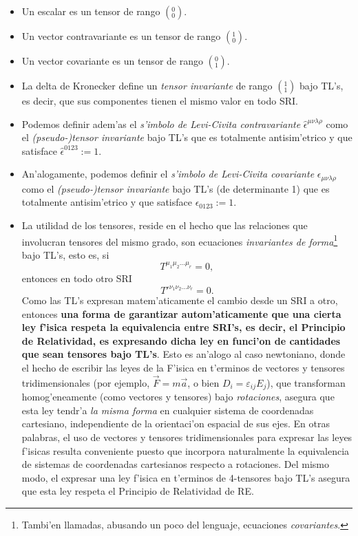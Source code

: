 \begin{itemize}
\item Un escalar es un tensor de rango $(^0_0)$.
\item Un vector contravariante es un tensor de rango $(^1_0)$.
\item Un vector covariante es un tensor de rango $(^0_1)$.
\item La delta de Kronecker define un \textit{tensor invariante} de rango $(^1_1)$ bajo TL's, es decir, que sus componentes tienen el mismo valor en todo SRI.
\item Podemos definir adem'as el \textit{s'imbolo de Levi-Civita contravariante} $\hat\epsilon^{\mu\nu\lambda\rho}$ como el \textit{(pseudo-)tensor invariante} bajo TL's que es totalmente antisim'etrico y que satisface $\hat\epsilon^{0123}:=1$.
\item An'alogamente, podemos definir el \textit{s'imbolo de Levi-Civita
covariante} $\epsilon_{\mu\nu\lambda\rho}$ como el \textit{(pseudo-)tensor invariante} bajo TL's (de determinante 1) que es totalmente antisim'etrico y
que satisface $\epsilon_{0123}:=1$.

\item La utilidad de los tensores, reside en el hecho que las relaciones que
involucran tensores del mismo grado, son ecuaciones 
\textit{invariantes de forma}\footnote{Tambi'en llamadas, abusando un poco del lenguaje, ecuaciones \textit{covariantes}.} bajo TL's, esto es, si
\begin{equation}
T^{\mu_1 \mu_2 ... \mu_r}=0,
\end{equation}
entonces en todo otro SRI 
\begin{equation}
T'^{\nu_1 \nu_2 ... \nu_r}=0.
\end{equation}
Como las TL's expresan matem'aticamente el cambio desde un SRI a otro, entonces \textbf{una forma de garantizar autom'aticamente que una cierta ley f'isica respeta la equivalencia entre SRI's, es decir, el Principio de Relatividad, es expresando dicha ley en funci'on de cantidades que sean tensores bajo TL's}. Esto es an'alogo al caso newtoniano, donde el hecho de escribir las leyes de la F'isica en t'erminos de vectores y tensores tridimensionales (por ejemplo,
$\vec{F}=m\vec{a}$, o bien $D_i=\varepsilon_{ij}E_j$), que transforman homog'eneamente (como vectores y tensores) bajo \textit{rotaciones}, asegura que esta ley tendr'a \textit{la misma forma} en cualquier sistema de coordenadas cartesiano, independiente de la orientaci'on espacial de sus ejes. En otras palabras, el uso de vectores y tensores tridimensionales para expresar las leyes f'isicas resulta conveniente puesto que incorpora naturalmente la equivalencia de sistemas de coordenadas cartesianos respecto a rotaciones. Del mismo modo, el expresar una ley f'isica en t'erminos de 4-tensores bajo TL's asegura que esta ley respeta el Principio de Relatividad de RE.

\end{itemize}

